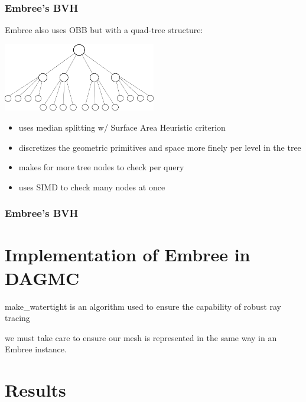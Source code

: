 \documentclass[12pt]{beamer}
\begin{document}
\begin{frame}

\frametitle{Embree's BVH}

Embree also uses OBB but with a quad-tree structure:

\begin{center}
\includegraphics[width=0.5\textwidth]{./images/quad_tree.png}
\end{center}

\begin{itemize}
\item uses median splitting w/ Surface Area Heuristic criterion
\item discretizes the geometric primitives and space more finely per level in the tree
\item makes for more tree nodes to check per query
\item uses SIMD to check many nodes at once
\end{itemize}

\end{frame}


\begin{frame}
\frametitle{Embree's BVH}


\end{frame}



\section{Implementation of Embree in DAGMC} %
\begin{frame}
  make\_watertight \cite{make_watertight_smith_2010} is an algorithm used to ensure the capability of robust ray tracing


  we must take care to ensure our mesh is represented in the same way in an Embree instance. 
  

\end{frame}

\section{Results} %
\end{document}
